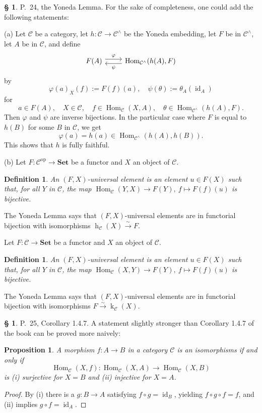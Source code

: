 \documentclass[12pt]{article}
\newtheorem{prop}[thm]{Proposition}
\newtheorem{df}[thm]{Definition}%
\theoremstyle{remark}
\theoremstyle{definition}
\newtheorem{s}[thm]{\S}
\newcommand{\C}{\mathcal C}
\newcommand{\Set}{\mathbf{Set}}
\newcommand{\xr}{\xrightarrow}
\DeclareMathOperator{\hy}{h}
\DeclareMathOperator{\ky}{k}
\DeclareMathOperator{\id}{id}
\DeclareMathOperator{\Hom}{Hom}%
\DeclareMathOperator{\op}{op}
\begin{document}
\begin{s} 
P.~24, the Yoneda Lemma. For the sake of completeness, one could add the following statements: 

\noindent(a) Let $\C$ be a category, let $h:\C\to\C^\wedge$ be the Yoneda embedding, let $F$ be in $\C^\wedge$, let $A$ be in $\C$, and define 
$$
\begin{tikzcd} 
F(A)\ar[yshift=0.7ex]{r}{\varphi}&\Hom_{\C^\wedge}(h(A),F)\ar[yshift=-0.7ex]{l}{\psi}
\end{tikzcd}
$$
by 
$$
\varphi(a)_X(f):=F(f)(a),\quad\psi(\theta):=\theta_A(\id_A)
$$
for 
$$
a\in F(A),\quad X\in\C,\quad f\in\Hom_\C(X,A),\quad\theta\in\Hom_{\C^\wedge}(h(A),F).
$$ 
Then $\varphi$ and $\psi$ are inverse bijections. In the particular case where $F$ is equal to $h(B)$ for some $B$ in $\C$, we get 
$$
\varphi(a)=h(a)\in\Hom_{\C^\wedge}(h(A),h(B)).
$$
This shows that $h$ is fully faithful.

\noindent(b) Let $F:\C^{\op}\to\Set$ be a functor and $X$ an object of $\C$.
%
\begin{df}\label{ue} 
An $(F,X)$-{\em universal element} is an element $u\in F(X)$ such that, for all $Y$ in $\C$, the map $\Hom_\C(Y,X)\to F(Y),\ f\mapsto F(f)(u)$ is bijective. 
\end{df}

The Yoneda Lemma says that $(F,X)$-universal elements are in functorial bijection with isomorphisms $\hy_\C(X)\xr\sim F$. 

Let $F:\C\to\Set$ be a functor and $X$ an object of $\C$.
%
\begin{df}\label{ue2} 
An $(F,X)$-{\em universal element} is an element $u\in F(X)$ such that, for all $Y$ in $\C$, the map $\Hom_\C(X,Y)\to F(Y),\ f\mapsto F(f)(u)$ is bijective. 
\end{df}

The Yoneda Lemma says that $(F,X)$-universal elements are in functorial bijection with isomorphisms $F\xr\sim\ky_\C(X)$.
\end{s}
%
%
\begin{s} 
P.~25, Corollary 1.4.7. A statement slightly stronger than Corollary 1.4.7 of the book can be proved more naively:
%
\begin{prop}
A morphism $f:A\to B$ in a category $\C$ is an isomorphisms if and only if 
$$
\Hom_\C(X,f):\Hom_\C(X,A)\to\Hom_\C(X,B)
$$
is (i) surjective for $X=B$ and (ii) injective for $X=A$.
\end{prop}
%
\begin{proof} By (i) there is a $g:B\to A$ satisfying $f\circ g=\id_B$, yielding $f\circ g\circ f=f$, and (ii) implies $g\circ f=\id_A$.
\end{proof}
\end{s}
\end{document}
